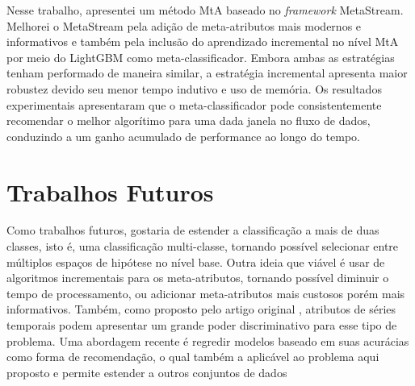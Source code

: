Nesse trabalho, apresentei um método MtA baseado no \textit{framework} MetaStream. Melhorei o MetaStream pela adição de meta-atributos mais modernos e informativos e também pela inclusão do aprendizado incremental no nível MtA por meio do LightGBM como meta-classificador. Embora ambas as estratégias tenham performado de maneira similar, a estratégia incremental apresenta maior robustez devido seu menor tempo indutivo e uso de memória. Os resultados experimentais apresentaram que o meta-classificador pode consistentemente recomendar o melhor algorítimo para uma dada janela no fluxo de dados, conduzindo a um ganho acumulado de performance ao longo do tempo.


\section{Trabalhos Futuros}
\label{sec:future}
Como trabalhos futuros, gostaria de estender a classificação a mais de duas classes, isto é, uma classificação multi-classe, tornando possível selecionar entre múltiplos espaços de hipótese no nível base. Outra ideia que viável é usar de algoritmos incrementais para os meta-atributos, tornando possível diminuir o tempo de processamento, ou adicionar meta-atributos mais custosos porém mais informativos. Também, como proposto pelo artigo original \cite{rossi2014metastream}, atributos de séries temporais podem apresentar um grande poder discriminativo para esse tipo de problema. Uma abordagem recente é regredir modelos baseado em suas acurácias como forma de recomendação, o qual também a aplicável ao problema aqui proposto e permite estender a outros conjuntos de dados